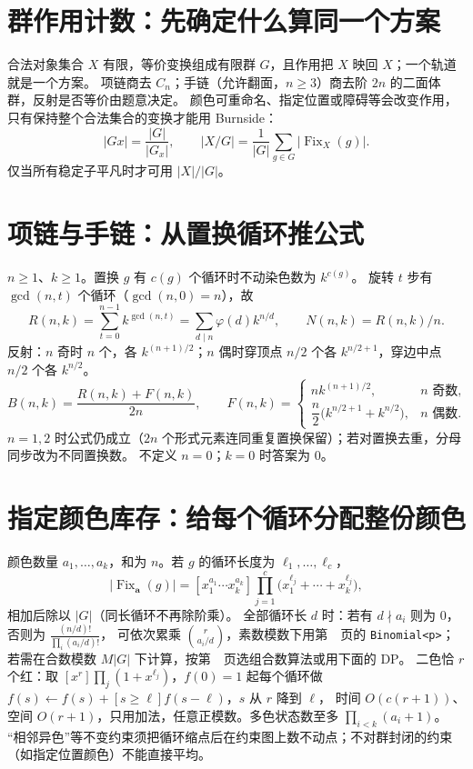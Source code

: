 \section{群作用计数：先确定什么算同一个方案}\label{knowledge-orbits-model}
合法对象集合 $X$ 有限，等价变换组成有限群 $G$，且作用把 $X$ 映回 $X$；一个轨道就是一个方案。
项链商去 $C_n$；手链（允许翻面，$n\ge3$）商去阶 $2n$ 的二面体群，反射是否等价由题意决定。
颜色可重命名、指定位置或障碍等会改变作用，只有保持整个合法集合的变换才能用 Burnside：
\[
|Gx|=\frac{|G|}{|G_x|},\qquad
|X/G|=\frac1{|G|}\sum_{g\in G}|\operatorname{Fix}_X(g)|.
\]
仅当所有稳定子平凡时才可用 $|X|/|G|$。

\section{项链与手链：从置换循环推公式}\label{knowledge-orbits-dihedral}
$n\ge1$、$k\ge1$。置换 $g$ 有 $c(g)$ 个循环时不动染色数为 $k^{c(g)}$。
旋转 $t$ 步有 $\gcd(n,t)$ 个循环（$\gcd(n,0)=n$），故
\[
R(n,k)=\sum_{t=0}^{n-1}k^{\gcd(n,t)}
      =\sum_{d\mid n}\varphi(d)k^{n/d},\qquad N(n,k)=R(n,k)/n.
\]
反射：$n$ 奇时 $n$ 个，各 $k^{(n+1)/2}$；$n$ 偶时穿顶点 $n/2$ 个各 $k^{n/2+1}$，穿边中点 $n/2$ 个各 $k^{n/2}$。
\[
B(n,k)=\frac{R(n,k)+F(n,k)}{2n},\qquad
F(n,k)=\begin{cases}
nk^{(n+1)/2},&n\text{ 奇数},\\
\dfrac n2\bigl(k^{n/2+1}+k^{n/2}\bigr),&n\text{ 偶数}.
\end{cases}
\]
$n=1,2$ 时公式仍成立（$2n$ 个形式元素连同重复置换保留）；若对置换去重，分母同步改为不同置换数。
不定义 $n=0$；$k=0$ 时答案为 0。

\section{指定颜色库存：给每个循环分配整份颜色}\label{knowledge-orbits-inventory}
颜色数量 $a_1,\ldots,a_k$，和为 $n$。若 $g$ 的循环长度为 $\ell_1,\ldots,\ell_c$，
\[
|\operatorname{Fix}_{\boldsymbol a}(g)|=
[x_1^{a_1}\cdots x_k^{a_k}]
\prod_{j=1}^{c}\bigl(x_1^{\ell_j}+\cdots+x_k^{\ell_j}\bigr),
\]
相加后除以 $|G|$（同长循环不再除阶乘）。
全部循环长 $d$ 时：若有 $d\nmid a_i$ 则为 0，否则为 $\frac{(n/d)!}{\prod_i(a_i/d)!}$，
可依次累乘 $\binom{r}{a_i/d}$，素数模数下用第~\pageref{compact-Binomial}~页的 \texttt{Binomial<p>}；
若需在合数模数 $M|G|$ 下计算，按第~\pageref{knowledge-binomial-choice}~页选组合数算法或用下面的 DP。
二色恰 $r$ 个红：取 $[x^r]\prod_j(1+x^{\ell_j})$，$f(0)=1$ 起每个循环做 $f(s)\gets f(s)+[s\ge\ell]f(s-\ell)$，$s$ 从 $r$ 降到 $\ell$，
时间 $O(c(r+1))$、空间 $O(r+1)$，只用加法，任意正模数。多色状态数至多 $\prod_{i<k}(a_i+1)$。
“相邻异色”等不变约束须把循环缩点后在约束图上数不动点；不对群封闭的约束（如指定位置颜色）不能直接平均。

